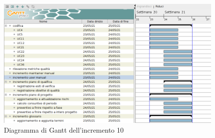 \begin{figure}[!ht]
    \caption{Diagramma di Gantt dell'incremento 10}
    \vspace{5px}
    \includegraphics[scale=0.3]{../../../Images/Diagrammi/Gantt/incremento10.png}
    \centering
\end{figure}

